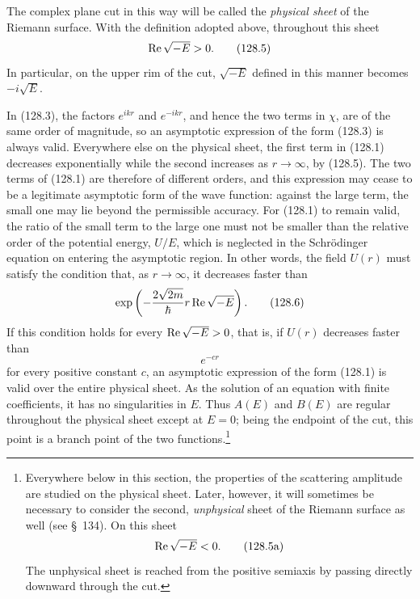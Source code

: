 The complex plane cut in this way will be called the \emph{physical sheet} of the Riemann surface. With the definition adopted above, throughout this sheet
\begin{equation}
 \mathop{\rm Re}\sqrt{-E}>0.
 \tag{128.5}
\end{equation}
In particular, on the upper rim of the cut, $\sqrt{-E}$ defined in this manner becomes $-i\sqrt E$.

In (128.3), the factors $e^{ikr}$ and $e^{-ikr}$, and hence the two terms in $\chi$, are of the same order of magnitude, so an asymptotic expression of the form (128.3) is always valid. Everywhere else on the physical sheet, the first term in (128.1) decreases exponentially while the second increases as $r\to\infty$, by (128.5). The two terms of (128.1) are therefore of different orders, and this expression may cease to be a legitimate asymptotic form of the wave function: against the large term, the small one may lie beyond the permissible accuracy. For (128.1) to remain valid, the ratio of the small term to the large one must not be smaller than the relative order of the potential energy, $U/E$, which is neglected in the Schrödinger equation on entering the asymptotic region. In other words, the field $U(r)$ must satisfy the condition that, as $r\to\infty$, it decreases faster than
\begin{equation}
 \exp\left(-\frac{2\sqrt{2m}}{\hbar}r\mathop{\rm Re}\sqrt{-E}\right).
 \tag{128.6}
\end{equation}
If this condition holds for every $\mathop{\rm Re}\sqrt{-E}>0$, that is, if $U(r)$ decreases faster than
\begin{equation}
 e^{-cr}
 \tag{128.6a}
\end{equation}
for every positive constant $c$, an asymptotic expression of the form (128.1) is valid over the entire physical sheet. As the solution of an equation with finite coefficients, it has no singularities in $E$. Thus $A(E)$ and $B(E)$ are regular throughout the physical sheet except at $E=0$; being the endpoint of the cut, this point is a branch point of the two functions.\footnote{Everywhere below in this section, the properties of the scattering amplitude are studied on the physical sheet. Later, however, it will sometimes be necessary to consider the second, \emph{unphysical} sheet of the Riemann surface as well (see §~134). On this sheet
\begin{equation}
 \mathop{\rm Re}\sqrt{-E}<0.
 \tag{128.5a}
\end{equation}
The unphysical sheet is reached from the positive semiaxis by passing directly downward through the cut.}

